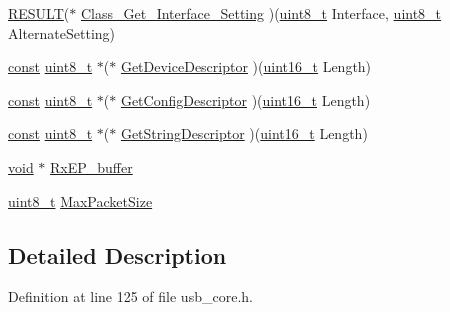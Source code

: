 \begin{DoxyCompactItemize}
\item 
\hyperlink{_s_t_m32_f10x_2_libraries_2_s_t_m32___u_s_b-_f_s-_device___driver_2inc_2usb__core_8h_ac0c5cc7751807fb0264baeab942bc8c3}{R\-E\-S\-U\-L\-T}($\ast$ \hyperlink{struct___d_e_v_i_c_e___p_r_o_p_ae6363d7d29b2b7c221378a4a8202a823}{Class\-\_\-\-Get\-\_\-\-Interface\-\_\-\-Setting} )(\hyperlink{stdint_8h_aba7bc1797add20fe3efdf37ced1182c5}{uint8\-\_\-t} Interface, \hyperlink{stdint_8h_aba7bc1797add20fe3efdf37ced1182c5}{uint8\-\_\-t} Alternate\-Setting)
\item 
\hyperlink{group___n_a_m_e_ga7ae6d0e43244213b34de2c2b9aa30da6}{const} \hyperlink{stdint_8h_aba7bc1797add20fe3efdf37ced1182c5}{uint8\-\_\-t} $\ast$($\ast$ \hyperlink{struct___d_e_v_i_c_e___p_r_o_p_a118997b0ccb5c33a1c58c361f8494a27}{Get\-Device\-Descriptor} )(\hyperlink{stdint_8h_a273cf69d639a59973b6019625df33e30}{uint16\-\_\-t} Length)
\item 
\hyperlink{group___n_a_m_e_ga7ae6d0e43244213b34de2c2b9aa30da6}{const} \hyperlink{stdint_8h_aba7bc1797add20fe3efdf37ced1182c5}{uint8\-\_\-t} $\ast$($\ast$ \hyperlink{struct___d_e_v_i_c_e___p_r_o_p_a3851a85ca88af6d71c93cc776af8df0e}{Get\-Config\-Descriptor} )(\hyperlink{stdint_8h_a273cf69d639a59973b6019625df33e30}{uint16\-\_\-t} Length)
\item 
\hyperlink{group___n_a_m_e_ga7ae6d0e43244213b34de2c2b9aa30da6}{const} \hyperlink{stdint_8h_aba7bc1797add20fe3efdf37ced1182c5}{uint8\-\_\-t} $\ast$($\ast$ \hyperlink{struct___d_e_v_i_c_e___p_r_o_p_acd3ec31fe235c694b464a2d788bd7cdf}{Get\-String\-Descriptor} )(\hyperlink{stdint_8h_a273cf69d639a59973b6019625df33e30}{uint16\-\_\-t} Length)
\item 
\hyperlink{group___n_a_m_e_ga18028b8badbf1ea7e704ccac3c488e82}{void} $\ast$ \hyperlink{struct___d_e_v_i_c_e___p_r_o_p_ad71c9c4ae4ef449f22e77ae38fc28a21}{Rx\-E\-P\-\_\-buffer}
\item 
\hyperlink{stdint_8h_aba7bc1797add20fe3efdf37ced1182c5}{uint8\-\_\-t} \hyperlink{struct___d_e_v_i_c_e___p_r_o_p_aa110e889cdf94f81f92342f84a235797}{Max\-Packet\-Size}
\end{DoxyCompactItemize}


\subsection{Detailed Description}


Definition at line 125 of file usb\-\_\-core.\-h.



